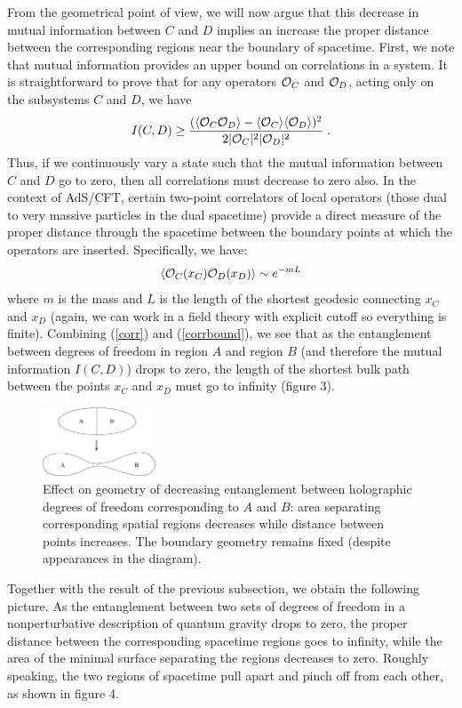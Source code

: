 \documentclass[12pt,epsf]{article}
\newcommand{\be}{\begin{equation}}
\newcommand{\ee}{\end{equation}}
\renewcommand{\(}{\left(}
\renewcommand{\)}{\right)}
\begin{document}
From the geometrical point of view, we will now argue that this decrease in mutual information between $C$ and $D$ implies an increase the proper distance between the corresponding regions near the boundary of spacetime. First, we note that mutual information provides an upper bound on correlations in a system. It is straightforward to prove \cite{wvhc} that for any operators ${\cal O}_C$ and ${\cal O}_D$, acting only on the subsystems $C$ and $D$, we have
\be
\label{corrbound}
I(C,D) \ge \frac{(\langle {\cal O}_C {\cal O}_D \rangle - \langle {\cal O}_C \rangle \langle {\cal O}_D \rangle  )^2}{2|{\cal O}_C|^2 |{\cal O}_D|^2} \; .
\ee
Thus, if we continuously vary a state such that the mutual information between $C$ and $D$ go to zero, then all correlations must decrease to zero also. In the context of AdS/CFT, certain two-point correlators of local operators (those dual to very massive particles in the dual spacetime) provide a direct measure of the proper distance through the spacetime between the boundary points at which the operators are inserted. Specifically, we have:
\be
\label{corr}
\langle {\cal O}_C(x_C) {\cal O}_D (x_D) \rangle \sim e^{-m L}
\ee
where $m$ is the mass and $L$ is the length of the shortest geodesic connecting $x_C$ and $x_D$ (again, we can work in a field theory with explicit cutoff so everything is finite). Combining (\ref{corr}) and (\ref{corrbound}), we see that as the entanglement between degrees of freedom in region $A$ and region $B$ (and therefore the mutual information $I(C,D)$) drops to zero, the length of the shortest bulk path between the points $x_C$ and $x_D$ must go to infinity (figure 3).
\begin{figure}
\centering
\includegraphics[width=0.3\textwidth]{pinch.eps}
\caption{Effect on geometry of decreasing entanglement between holographic degrees of freedom corresponding to $A$ and $B$: area separating corresponding spatial regions decreases while distance between points increases. The boundary geometry remains fixed (despite appearances in the diagram).}
\end{figure}
Together with the result of the previous subsection, we obtain the following picture. As the entanglement between two sets of degrees of freedom in a nonperturbative description of quantum gravity drops to zero, the proper distance between the corresponding spacetime regions goes to infinity, while the area of the minimal surface separating the regions decreases to zero. Roughly speaking, the two regions of spacetime pull apart and pinch off from each other, as shown in figure 4.
\end{document}
